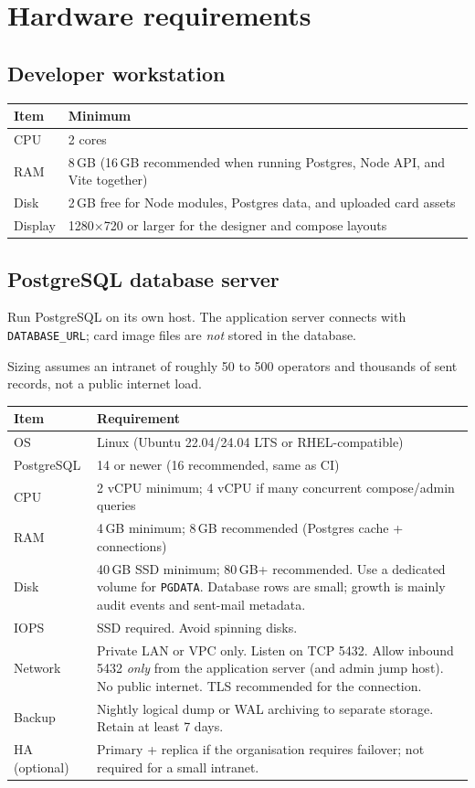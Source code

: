 \documentclass[11pt,a4paper]{article}
\begin{document}
\section{Hardware requirements}

\subsection{Developer workstation}
\begin{tabularx}{\textwidth}{lX}
  \toprule
  \textbf{Item} & \textbf{Minimum} \\
  \midrule
  CPU & 2 cores \\
  RAM & 8\,GB (16\,GB recommended when running Postgres, Node API, and Vite together) \\
  Disk & 2\,GB free for Node modules, Postgres data, and uploaded card assets \\
  Display & 1280$\times$720 or larger for the designer and compose layouts \\
  \bottomrule
\end{tabularx}

\subsection{PostgreSQL database server}
Run PostgreSQL on its own host. The application server connects with \texttt{DATABASE\_URL}; card image files are \emph{not} stored in the database.

Sizing assumes an intranet of roughly 50 to 500 operators and thousands of sent records, not a public internet load.

\begin{tabularx}{\textwidth}{lX}
  \toprule
  \textbf{Item} & \textbf{Requirement} \\
  \midrule
  OS & Linux (Ubuntu 22.04/24.04 LTS or RHEL-compatible) \\
  PostgreSQL & 14 or newer (16 recommended, same as CI) \\
  CPU & 2 vCPU minimum; 4 vCPU if many concurrent compose/admin queries \\
  RAM & 4\,GB minimum; 8\,GB recommended (Postgres cache + connections) \\
  Disk & 40\,GB SSD minimum; 80\,GB+ recommended. Use a dedicated volume for \texttt{PGDATA}. Database rows are small; growth is mainly audit events and sent-mail metadata. \\
  IOPS & SSD required. Avoid spinning disks. \\
  Network & Private LAN or VPC only. Listen on TCP 5432. Allow inbound 5432 \emph{only} from the application server (and admin jump host). No public internet. TLS recommended for the connection. \\
  Backup & Nightly logical dump or WAL archiving to separate storage. Retain at least 7 days. \\
  HA (optional) & Primary + replica if the organisation requires failover; not required for a small intranet. \\
  \bottomrule
\end{tabularx}
\end{document}
